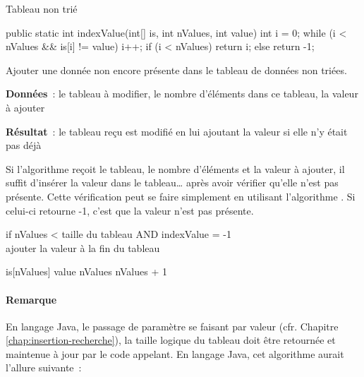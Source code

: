 \begin{Fiche}{Tableau non trié}
		\begin{java}
public static int indexValue(int[] is, int nValues, int value){
	int i = 0;
	while (i < nValues && is[i] != value){
		i++;
	}
	if (i < nValues){
		return i;
	} else {
		return -1;
	}
}
		\end{java}




	Ajouter une donnée non encore présente dans le tableau de données non
	triées.
	
	\textbf{Données}~: le tableau à modifier, le nombre d'éléments dans ce
	tableau, la valeur à ajouter
		
	\textbf{Résultat}~: le tableau reçu est modifié en lui ajoutant la valeur si
	elle n'y était pas déjà
	

	Si l'algorithme reçoit le tableau, le nombre d'éléments et la valeur
	à ajouter, il suffit d'insérer la valeur dans le tableau… après avoir
	vérifier qu'elle n'est pas présente. Cette vérification peut se faire
	simplement en utilisant l'algorithme . Si celui-ci retourne
	-1, c'est que la valeur n'est pas présente. 

	\begin{langagenaturel}
		if nValues < taille du tableau AND indexValue = -1\\
		\tab ajouter la valeur à la fin du tableau
	\end{langagenaturel}

		\begin{pseudocode}
					\Let is[nValues] \Gets value
					\Let nValues \Gets nValues + 1
				\EndIf
			\EndAlgo
		\end{pseudocode}

		\paragraph{Remarque} 
		
		En langage Java, le passage de paramètre se faisant par valeur (cfr.
		Chapitre \vref{chap:insertion-recherche}), la taille logique du tableau
		doit être retournée et maintenue à jour par le code appelant. En
		langage Java, cet algorithme aurait l'allure suivante~:


\end{Fiche}
